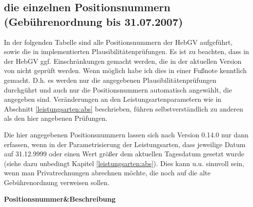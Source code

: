 \subsection{die einzelnen Positionsnummern (Gebührenordnung bis 31.07.2007)}
In der folgenden Tabelle sind alle Positionsnummern der HebGV
aufgeführt, sowie die in \tinyHeb\/ implementierten Plausibilitätenprüfungen.
Es ist zu beachten, dass in der HebGV ggf. Einschränkungen gemacht werden,
die in der aktuellen Version von \tinyHeb\/ nicht geprüft werden.
Wenn möglich habe ich dies in einer Fußnote kenntlich gemacht.
D.h. es werden nur die angegebenen Plausibilitätenprüfungen durchgührt und
auch nur die Positionsnummern automatisch angewählt, die angegeben sind.
Veränderungen an den Leistungsartenparametern wie in Abschnitt
\vref{leistungsarten:abs} beschrieben, führen selbstverständlich zu 
anderen als den hier angebenen Prüfungen. 

Die hier angegebenen
Positionsnummern lassen sich nach \tinyHeb\/ Version 0.14.0 nur dann erfassen,
wenn in der Parametrisierung der Leistungsarten, dass jeweilige 
 Datum auf 31.12.9999 oder einen Wert größer dem 
aktuellen Tagesdatum gesetzt wurde (siehe dazu unbedingt Kapitel
\ref{leistungsarten:abs}). Dies kann u.u. sinnvoll sein, wenn man
Privatrechnungen abrechnen möchte, die noch auf die alte Gebührenordnung
verweisen sollen.



\tablehead
{\hline \bfseries Positions\-nummer&\bfseries Beschreibung\\ \hline}

\tabletail
{\hline {}\\}

